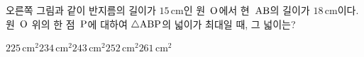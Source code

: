 \noindent\begin{minipage}[t]{0.58\linewidth}\vspace{0pt}\raggedright 오른쪽 그림과 같이 반지름의 길이가 $15\,\mathrm{cm}$인 원~$\mathrm{O}$에서 현~$\mathrm{AB}$의 길이가 $18\,\mathrm{cm}$이다. 원~$\mathrm{O}$ 위의 한 점~$\mathrm{P}$에 대하여 $\triangle\mathrm{ABP}$의 넓이가 최대일 때, 그 넓이는?\end{minipage}\hfill\begin{minipage}[t]{0.4\linewidth}\vspace{0pt}\centering \resizebox{\ifdim\width>\linewidth\linewidth\else\width\fi}{!}{}\end{minipage}\par
\begin{choices32}{$225\,\mathrm{cm}^2$}{$234\,\mathrm{cm}^2$}{$243\,\mathrm{cm}^2$}{$252\,\mathrm{cm}^2$}{$261\,\mathrm{cm}^2$}\end{choices32}

